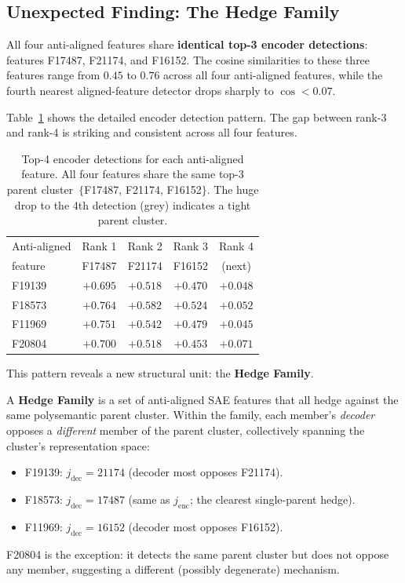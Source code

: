 \documentclass[11pt,a4paper]{article}
\newcommand{\jenc}{j_{\mathrm{enc}}}
\newcommand{\jdec}{j_{\mathrm{dec}}}
\begin{document}
\subsection{Unexpected Finding: The Hedge Family}
\label{sec:hedge_family}

\begin{revealed}
All four anti-aligned features share \textbf{identical top-3 encoder detections}:
features F17487, F21174, and F16152.  The cosine similarities to these three features
range from $0.45$ to $0.76$ across all four anti-aligned features, while the fourth
nearest aligned-feature detector drops sharply to $\cos < 0.07$.
\end{revealed}

Table~\ref{tab:hedge_family} shows the detailed encoder detection pattern.  The gap
between rank-3 and rank-4 is striking and consistent across all four features.

\begin{table}[H]
\centering
\caption{Top-4 encoder detections for each anti-aligned feature.
All four features share the same top-3 parent cluster~$\{$F17487, F21174, F16152$\}$.
The huge drop to the 4th detection (grey) indicates a tight parent cluster.}
\label{tab:hedge_family}
\begin{tabular}{@{}lcccc@{}}
\toprule
Anti-aligned & Rank 1 & Rank 2 & Rank 3 & {\color{gray}Rank 4} \\
feature & F17487 & F21174 & F16152 & {\color{gray}(next)} \\
\midrule
F19139 & $+0.695$ & $+0.518$ & $+0.470$ & {\color{gray}$+0.048$} \\
F18573 & $+0.764$ & $+0.582$ & $+0.524$ & {\color{gray}$+0.052$} \\
F11969 & $+0.751$ & $+0.542$ & $+0.479$ & {\color{gray}$+0.045$} \\
F20804 & $+0.700$ & $+0.518$ & $+0.453$ & {\color{gray}$+0.071$} \\
\bottomrule
\end{tabular}
\end{table}

This pattern reveals a new structural unit: the \textbf{Hedge Family}.

\begin{keyinsight}
A \textbf{Hedge Family} is a set of anti-aligned SAE features that all hedge against
the same polysemantic parent cluster.  Within the family, each member's \emph{decoder}
opposes a \emph{different} member of the parent cluster, collectively spanning the
cluster's representation space:
\begin{itemize}[noitemsep]
  \item F19139: $\jdec{=}21174$ (decoder most opposes F21174).
  \item F18573: $\jdec{=}17487$ (same as $\jenc$; the clearest single-parent hedge).
  \item F11969: $\jdec{=}16152$ (decoder most opposes F16152).
\end{itemize}
F20804 is the exception: it detects the same parent cluster but does not oppose
any member, suggesting a different (possibly degenerate) mechanism.
\end{keyinsight}
\end{document}
